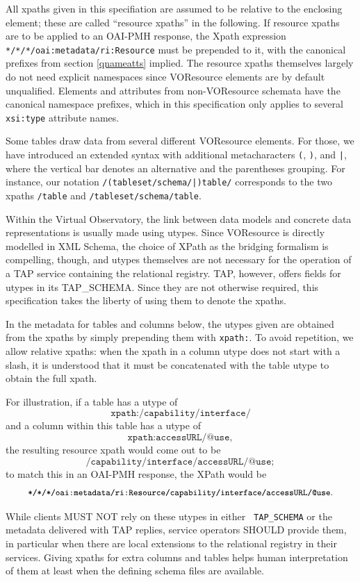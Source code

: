 \documentclass[11pt,a4paper]{ivoa}
\newcommand{\tapent}[1]{\texttt{\color{tapcolor} #1}}
\begin{document}
All xpaths given in this specifiation are assumed to be relative to
the enclosing  element; these are called
``resource xpaths'' in the following.  If resource xpaths are to be
applied to an OAI-PMH response, the Xpath expression
\texttt{*/*/*/oai:metadata/ri:Resource} must be prepended to it,
with the canonical prefixes from section \ref{qnameatts} implied.  The resource xpaths themselves
largely do not need explicit namespaces since VOResource elements are by
default unqualified.  Elements and attributes from non-VOResource
schemata have the canonical namespace prefixes, which in this
specification only applies to several \texttt{xsi:type} attribute
names.

Some tables draw data from several different VOResource elements.
For those, we have introduced an extended syntax with additional
metacharacters \verb$($, \verb$)$, and \verb$|$, 
where the vertical bar denotes an
alternative and the parentheses grouping.  For instance, our notation
\texttt{/(tableset/schema/|)table/} corresponds to the two xpaths
\texttt{/table} and \texttt{/tableset/schema/table}.

Within the Virtual Observatory, the link between data models and
concrete data representations is usually made using utypes.
Since VOResource is directly modelled
in XML Schema, the choice of XPath as the bridging formalism is 
compelling, though, and utypes themselves are not necessary for the
operation of a TAP service containing the relational registry.
TAP, however, offers fields for utypes in its TAP\_SCHEMA.  Since they
are not otherwise required, this specification takes the liberty of
using them to denote the xpaths.

In the metadata for tables and columns below, the utypes given are
obtained from the xpaths by simply prepending them with
\texttt{xpath:}.  To avoid repetition, we allow relative xpaths:
when the xpath in a column utype does not start with a slash, it is
understood that it must be concatenated with the table utype to obtain
the full xpath.

For illustration, if a table has a utype of
$$\texttt{xpath:/capability/interface/}$$ and a column within this table
has a utype of $$\texttt{xpath:accessURL/@use},$$ the resulting resource
xpath would come out to be
$$\texttt{/capability/interface/accessURL/@use};$$ to match this in an
OAI-PMH response, the XPath would be
$$\texttt{\small
*/*/*/oai:metadata/ri:Resource/capability/interface/accessURL/@use}.$$


While clients MUST NOT rely on these utypes in either
\tapent{TAP\_SCHEMA} or the
metadata delivered with TAP replies, service operators SHOULD provide them, in
particular when there are local extensions to the relational registry in their
services.  Giving xpaths for extra columns and tables helps human
interpretation of them at least when the defining schema files are
available.
\end{document}
